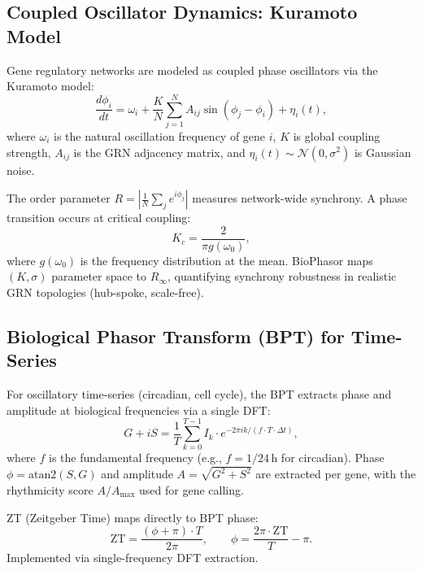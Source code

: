 \documentclass[preprint,12pt,amsmath,amssymb,superscriptaddress,floatfix]{revtex4-2}
\begin{document}
\subsection{Coupled Oscillator Dynamics: Kuramoto Model}
\label{subsec:kuramoto}

Gene regulatory networks are modeled as coupled phase oscillators via the
Kuramoto model:
\begin{equation}
    \frac{d\phi_i}{dt} = \omega_i + \frac{K}{N}\sum_{j=1}^N
    A_{ij}\sin(\phi_j - \phi_i) + \eta_i(t),
\end{equation}
where $\omega_i$ is the natural oscillation frequency of gene $i$,
$K$ is global coupling strength, $A_{ij}$ is the GRN adjacency matrix,
and $\eta_i(t) \sim \mathcal{N}(0, \sigma^2)$ is Gaussian noise.

The order parameter $R = |\frac{1}{N}\sum_j e^{i\phi_j}|$ measures
network-wide synchrony.
A phase transition occurs at critical coupling:
\begin{equation}
    K_c = \frac{2}{\pi g(\omega_0)},
\end{equation}
where $g(\omega_0)$ is the frequency distribution at the mean.
BioPhasor maps $(K,\sigma)$ parameter space to $R_\infty$,
quantifying synchrony robustness in realistic GRN topologies
(hub-spoke, scale-free).

\subsection{Biological Phasor Transform (BPT) for Time-Series}
\label{subsec:bpt}

For oscillatory time-series (circadian, cell cycle), the BPT extracts
phase and amplitude at biological frequencies via a single DFT:
\begin{equation}
    G + iS = \frac{1}{T}\sum_{k=0}^{T-1} I_k \cdot e^{-2\pi i k/(f\cdot T\cdot\Delta t)},
\end{equation}
where $f$ is the fundamental frequency (e.g., $f = 1/24$\,h for circadian).
Phase $\phi = \mathrm{atan2}(S,G)$ and amplitude $A = \sqrt{G^2+S^2}$
are extracted per gene, with the rhythmicity score $A/A_{\max}$ used
for gene calling.

ZT (Zeitgeber Time) maps directly to BPT phase:
\begin{equation}
    \mathrm{ZT} = \frac{(\phi+\pi)\cdot T}{2\pi}, \qquad
    \phi = \frac{2\pi\cdot\mathrm{ZT}}{T} - \pi.
\end{equation}
Implemented via single-frequency DFT extraction.
\end{document}
